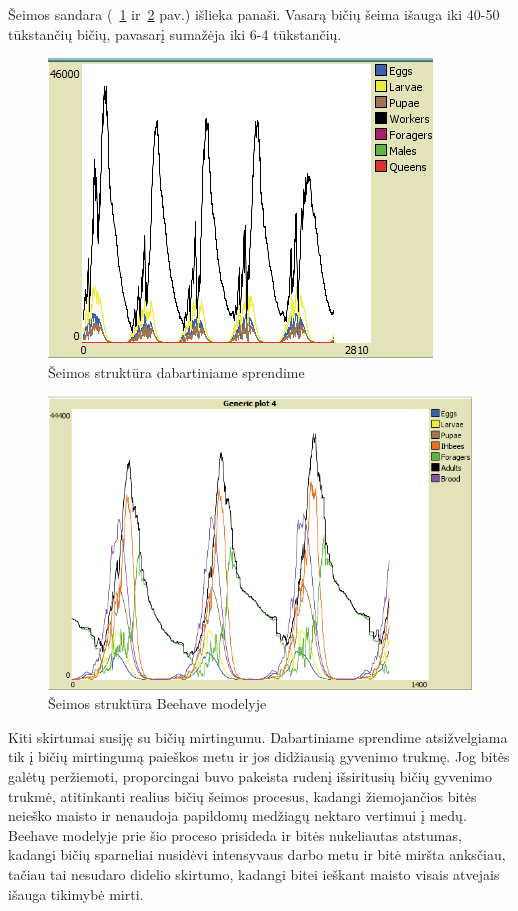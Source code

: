 \documentclass{VUMIFKompMagistrinis}
\begin{document}
Šeimos sandara (~\ref{img:m7} ir~\ref{img:m8} pav.) išlieka panaši. Vasarą bičių šeima išauga iki 40-50 tūkstančių bičių, pavasarį sumažėja iki 6-4 tūkstančių.

\begin{figure}[H]
    \centering
    \includegraphics[scale=0.75]{img/mtd3/mtdp3v11-img007.png}
    \caption{Šeimos struktūra dabartiniame sprendime}
    \label{img:m7}
\end{figure}

\begin{figure}[H]
    \centering
    \includegraphics[scale=0.75]{img/mtd3/mtdp3v11-img008.png}
    \caption{Šeimos struktūra Beehave modelyje}
    \label{img:m8}
\end{figure}


Kiti skirtumai susiję su bičių mirtingumu. Dabartiniame sprendime atsižvelgiama tik į bičių mirtingumą paieškos metu ir jos didžiausią gyvenimo trukmę. Jog bitės galėtų peržiemoti, proporcingai buvo pakeista rudenį išsiritusių bičių gyvenimo trukmė, atitinkanti realius bičių šeimos procesus, kadangi žiemojančios bitės neieško maisto ir nenaudoja papildomų medžiagų nektaro vertimui į medų.  Beehave modelyje prie šio proceso prisideda ir bitės nukeliautas atstumas, kadangi bičių sparneliai nusidėvi intensyvaus darbo metu ir bitė miršta anksčiau, tačiau tai nesudaro didelio skirtumo, kadangi bitei ieškant maisto visais atvejais išauga tikimybė mirti.
\end{document}
